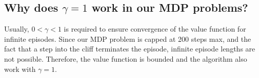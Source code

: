 \subsection{Why does $\gamma=1$ work in our MDP problems?}
Usually, $0 < \gamma < 1$ is required to ensure convergence of the value function for infinite episodes. Since our MDP problem is capped at 200 steps max, and the fact that a step into the cliff terminates the episode, infinite episode lengths are not possible. Therefore, the value function is bounded and the algorithm also work with $\gamma = 1$.